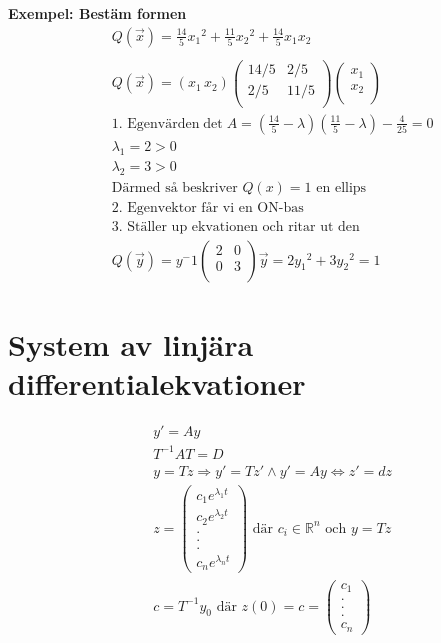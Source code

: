 \textbf{Exempel: Bestäm formen}
\begin{align*}
  &\quad  Q(\vec{x})= \frac{14}{5}{x_1}^2 +  \frac{11}{5}{x_2}^2 + \frac{14}{5}x_1x_2  \\
  &\quad  \\
  &\quad  Q(\vec{x}) = (x_1 \, x_2 )
  \left(\begin{array}{cc}
    14/5 &  2/5  \\
     2/5 & 11/5  \\
  \end{array}\right) \begin{pmatrix} x_1 \\ x_2 \\ \end{pmatrix} \\
  &\quad  \text{1. Egenvärden} \det{A} = (\frac{14}{5} -\lambda) (\frac{11}{5} -\lambda) -\frac{4}{25} = 0 \\
  &\quad  \lambda_1 = 2 > 0 \\
  &\quad  \lambda_2 = 3 > 0 \\
  &\quad  \text{Därmed så beskriver $Q(x)=1$ en ellips} \\
  &\quad  \text{2. Egenvektor får vi en ON-bas} \\
  &\quad  \text{3. Ställer up ekvationen och ritar ut den} \\
  &\quad  Q (\vec{y}) = y^-1
  \left(\begin{array}{cc}
    2 & 0  \\
    0 & 3  \\
  \end{array}\right) \vec{y} = 2{y_1}^2 + 3{y_2}^2 = 1
\end{align*}


\section{System av linjära differentialekvationer}
\begin{align*}
  &\quad  y'=Ay \\
  &\quad  T^{-1}AT=D \\
  &\quad  y=Tz \Rightarrow y'=Tz' \land y'=Ay \Leftrightarrow z'=dz \\
  &\quad  z=
  \begin{pmatrix} c_1e^{\lambda_1t} \\ c_2e^{\lambda_2t} \\.\\.\\.\\ c_n e^{\lambda_n t} \end{pmatrix}
  \text{ där } c_i\in\mathbb{R}^n  \text{ och } y=Tz \\
  &\quad  c = T^{-1}y_0 \text{ där } z(0) = c =
    \begin{pmatrix} c_1 \\.\\.\\.\\ c_n \end{pmatrix} 
\end{align*}

